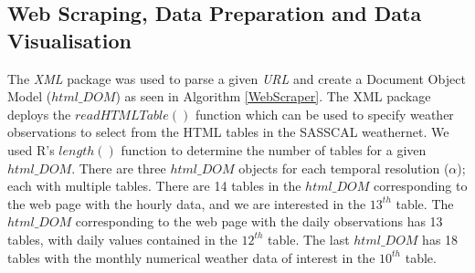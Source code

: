 \documentclass[a4paper, 10pt, conference]{ieeeconf}      %
\begin{document}
\subsection{Web Scraping, Data Preparation and Data Visualisation}
\noindent
The  \emph{XML} package \cite{lang2013package}  was used  to parse a given \emph{URL} and create a Document Object Model ($html\_DOM$)  as seen in Algorithm \ref{WebScraper}.
The %
XML package  deploys the $readHTMLTable()$ function which can be used to  specify weather observations to  select from  the HTML tables in the SASSCAL weathernet. 
 We used R's $length()$ function to determine the number of tables for a given $html\_DOM$. There are three $html\_DOM$ objects for each temporal resolution ($\alpha$); each with  multiple tables. 
There are 14 tables in the $html\_DOM$ corresponding to the web page with the hourly data, and we are interested in the $13^{th}$ table. The $html\_DOM$ corresponding to the web page with the daily observations has   13 tables, with daily values contained in the $12^{th}$ table. The last $html\_DOM$  has 18 tables with  the  monthly numerical weather data of interest  in the $10^{th}$ table.
\end{document}
